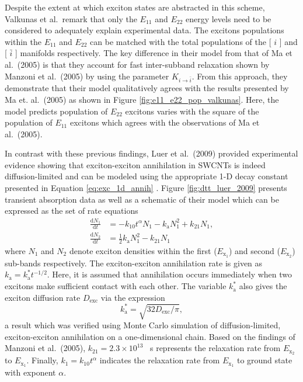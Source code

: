 Despite the extent at which exciton states are abstracted in this scheme, Valkunas et al.\ remark that only the $E_{11}$ and $E_{22}$ energy levels need to be considered to adequately explain experimental data. The excitons populations within the $E_{11}$ and $E_{22}$ can be matched with the total populations of the [ $i$ ] and [ $\bar{i}$ ] manifolds respectively. The key difference in their model from that of Ma et al.\ (2005) is that they account for fast inter-subband relaxation shown by Manzoni et al.\ (2005) by using the parameter $K_{i \rightarrow \bar{i}}$.
From this approach, they demonstrate that their model qualitatively agrees with the results presented by Ma et. al.\ (2005) as shown in Figure \ref{fig:e11_e22_pop_valkunas}. Here, the model predicts population of $E_{22}$ excitons varies with the square of the population of $E_{11}$ excitons which agrees with the observations of Ma et al.\ (2005).

In contrast with these previous findings, Luer et al.\ (2009) provided experimental evidence showing that exciton-exciton annihilation in SWCNTs is indeed diffusion-limited and can be modeled using the appropriate 1-D decay constant presented in Equation \eqref{eq:exc_1d_annih} \cite{luer2009size}. Figure \ref{fig:dtt_luer_2009} presents transient absorption data as well as a schematic of their model which can be expressed as the set of rate equations
%
\begin{equation}
	\begin{split}
			\frac{\mathrm{d} N_1}{\mathrm{d} t} &= -k_{10} t^{\alpha} N_1 - k_\text{a}N_1^2 + k_{21} N_1,
			\\
			\frac{\mathrm{d} N_2}{\mathrm{d} t} &= \frac{1}{2} k_\text{a} N_1^2 - k_{21} N_1
	\end{split}
\end{equation}
%
where $N_1$ and $N_2$ denote exciton densities within the first ($E_{\text{x}_1}$) and second ($E_{\text{x}_2}$) sub-bands respectively. The exciton-exciton annihilation rate is given as $k_\text{a} = k_\text{a}^* t^{-1/2}$. Here, it is assumed that annihilation occurs immediately when two excitons make sufficient contact with each other. The variable $k_\text{a}^*$ also gives the exciton diffusion rate $D_\text{exc}$ via the expression
\begin{equation}
	k_\text{a}^* = \sqrt{32 D_\text{exc}/ \pi},
	\label{eq:exc_anih_diffuse_luer_2009}
\end{equation}
a result which was verified using Monte Carlo simulation of diffusion-limited, exciton-exciton annihilation on a one-dimensional chain. Based on the findings of Manzoni et al.\ (2005), $k_{21} = 2.3 \times 10^{13}$ \si{\per\second} represents the relaxation rate from $ E_{\text{x}_2} $ to $E_{\text{x}_1}$. Finally, $k_{1} = k_{10}t^\alpha $ indicates the relaxation rate from $E_{\text{x}_1}$ to ground state with exponent $\alpha$.

